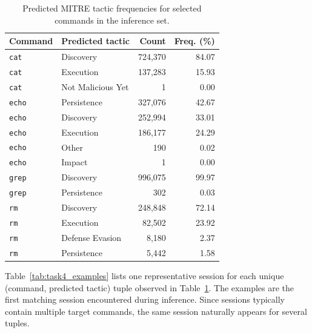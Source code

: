 \begin{table}[H]
    \centering
    {\footnotesize
    \renewcommand{\arraystretch}{1.08}
    \setlength{\tabcolsep}{7pt}
    \begin{tabular}{@{}llrr@{}}
        \toprule
        \textbf{Command} & \textbf{Predicted tactic} & \textbf{Count} &
        \textbf{Freq. (\%)} \\
        \midrule
        \texttt{cat} & Discovery & 724,370 & 84.07 \\
        \texttt{cat} & Execution & 137,283 & 15.93 \\
        \texttt{cat} & Not Malicious Yet & 1 & 0.00 \\
        \texttt{echo} & Persistence & 327,076 & 42.67 \\
        \texttt{echo} & Discovery & 252,994 & 33.01 \\
        \texttt{echo} & Execution & 186,177 & 24.29 \\
        \texttt{echo} & Other & 190 & 0.02 \\
        \texttt{echo} & Impact & 1 & 0.00 \\
        \texttt{grep} & Discovery & 996,075 & 99.97 \\
        \texttt{grep} & Persistence & 302 & 0.03 \\
        \texttt{rm} & Discovery & 248,848 & 72.14 \\
        \texttt{rm} & Execution & 82,502 & 23.92 \\
        \texttt{rm} & Defense Evasion & 8,180 & 2.37 \\
        \texttt{rm} & Persistence & 5,442 & 1.58 \\
        \bottomrule
    \end{tabular}
    \vspace{0.1cm}
    \caption{Predicted MITRE tactic frequencies for selected commands in the
    inference set.}
    \label{tab:task4_commands}
    }
\end{table}

\noindent
Table~\ref{tab:task4_examples} lists one
representative session for each unique (command, predicted tactic) tuple
observed in Table~\ref{tab:task4_commands}. The examples are the first matching
session encountered during inference. Since sessions typically contain multiple
target commands, the same session naturally appears for several tuples.

\vspace{0.1cm}

